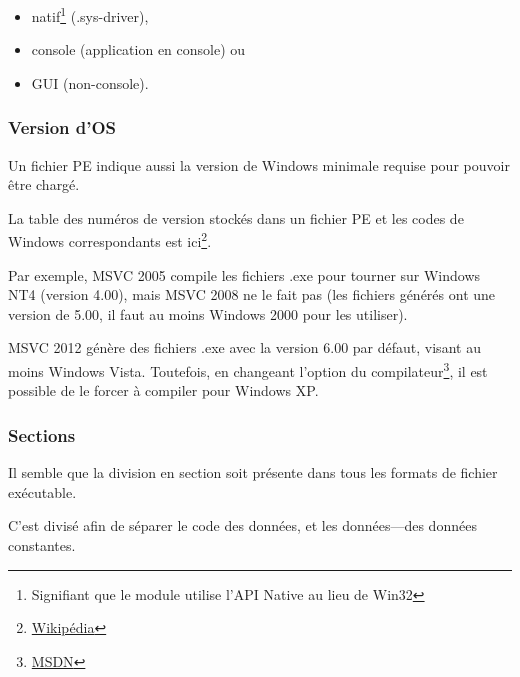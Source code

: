 
\begin{itemize}
\item natif\footnote{Signifiant que le module utilise l'API Native au lieu de Win32} (.sys-driver), 

\item console (application en console) ou

\item \ac{GUI} (non-console).
\end{itemize}

\subsubsection{Version d'OS}

Un fichier PE indique aussi la version de Windows minimale requise pour pouvoir être
chargé.

La table des numéros de version stockés dans un fichier PE et les codes de Windows
correspondants est ici\footnote{\href{http://go.yurichev.com/17044}{Wikipédia}}.

Par exemple, \ac{MSVC} 2005 compile les fichiers .exe pour tourner sur Windows NT4
(version 4.00), mais \ac{MSVC} 2008 ne le fait pas (les fichiers générés ont une
version de 5.00, il faut au moins Windows 2000 pour les utiliser).


\ac{MSVC} 2012 génère des fichiers .exe avec la version 6.00 par défaut, visant au
moins Windows Vista.
Toutefois, en changeant l'option du compilateur\footnote{\href{http://go.yurichev.com/17045}{MSDN}},
il est possible de le forcer à compiler pour Windows XP.

\subsubsection{Sections}

Il semble que la division en section soit présente dans tous les formats de fichier
exécutable.

C'est divisé afin de séparer le code des données, et les données---des données constantes.

